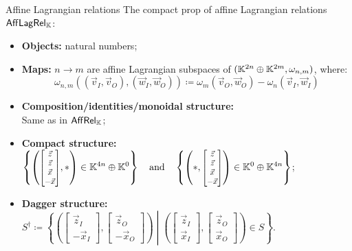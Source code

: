 \documentclass{beamer}
\newcommand\scalemath[2]{\scalebox{#1}{\mbox{\ensuremath{\displaystyle #2}}}}
\begin{document}
\begin{frame}{Affine Lagrangian relations}
The compact prop of affine Lagrangian relations \(\ALR\):
\begin{itemize}
\item \textbf{Objects:} natural numbers;
\item \textbf{Maps:} \(n\to m\) are affine Lagrangian subspaces of \((\mathbb{K}^{2n}\oplus \mathbb{K}^{2m}, \omega_{n,m})\), where:
\[\omega_{n,m} ((\vec v_I, \vec v_O),(\vec w_I, \vec w_O) ) \coloneqq \omega_m(\vec v_O, \vec w_O)-\omega_n(\vec v_I, \vec w_I)\]

\item \textbf{Composition/identities/monoidal structure:}\\Same as in \(\AR\);
\item \textbf{Compact structure:}\\
\null
\vspace*{-.2cm}
\hspace*{-1cm}
\(\displaystyle
\left\{ \left( \scalemath{.8}{\begin{bmatrix}\vec z \\ \vec z \\ \vec x \\ -\vec x  \end{bmatrix}}, *\right)  \in \K^{4n}\oplus\K^0\right\}
\qand
\left\{ \left( *, \scalemath{.8}{\begin{bmatrix}\vec z \\ \vec z \\ \vec x \\ -\vec x  \end{bmatrix}}\right)   \in \K^{0}\oplus\K^{4n} \right\}
\);

\item \textbf{Dagger structure:}\hfil
\(S^\dag \coloneqq \left\{ \left( \begin{bmatrix}\vec z_I\\  -\vec x_I \end{bmatrix},  \begin{bmatrix}\vec z_O\\ -\vec x_O \end{bmatrix} \right) \middle|  \left( \begin{bmatrix}\vec z_I\\ \vec x_I \end{bmatrix},  \begin{bmatrix}\vec z_O\\ \vec x_O \end{bmatrix} \right) \in S \right\}\).
\end{itemize}

\end{frame}
\end{document}
